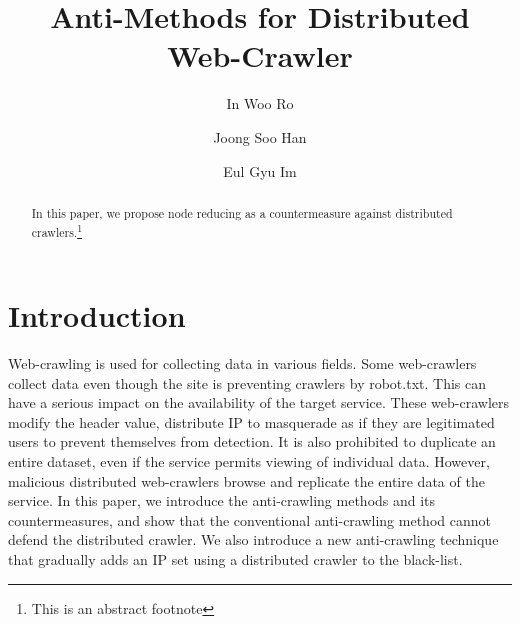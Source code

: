\documentclass[sigconf,anonymous=false]{acmart}
\begin{document}
\title{Anti-Methods for Distributed Web-Crawler}

\author{In Woo Ro}

\author{Joong Soo Han}

\author{Eul Gyu Im}

\renewcommand{\shortauthors}{B. Trovato et al.}


\begin{abstract}
In this paper, we propose node reducing as a countermeasure against distributed crawlers.\footnote{This is an abstract footnote}
\end{abstract}



\maketitle


%
%
\section{Introduction}
Web-crawling is used for collecting data in various fields. Some web-crawlers collect data even though the site is preventing crawlers by robot.txt. This can have a serious impact on the availability of the target service. These web-crawlers modify the header value, distribute IP to masquerade as if they are legitimated users to prevent themselves from detection.
It is also prohibited to duplicate an entire dataset, even if the service permits viewing of individual data. However, malicious distributed web-crawlers browse and replicate the entire data of the service.
In this paper, we introduce the anti-crawling methods and its countermeasures, and show that the conventional anti-crawling method cannot defend the distributed crawler. We also introduce a new anti-crawling technique that gradually adds an IP set using a distributed crawler to the black-list.
\end{document}
